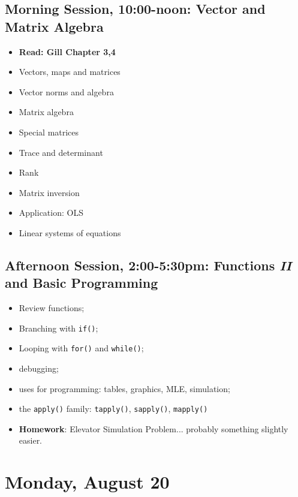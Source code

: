 \documentclass[12pt,a4paper]{article}
\begin{document}
\subsection*{Morning Session, 10:00-noon: Vector and Matrix Algebra}
\begin{itemize}
\setlength{\itemsep}{0pt}
\footnotesize
\item \textbf{Read: Gill Chapter 3,4}
\item Vectors, maps and matrices
\item Vector norms and algebra
\item Matrix algebra
\item Special matrices
\item Trace and determinant
\item Rank
\item Matrix inversion
\item Application: OLS
\item Linear systems of equations


\end{itemize}




\subsection*{Afternoon Session, 2:00-5:30pm: Functions \emph{II} and Basic Programming}
\begin{itemize}
\setlength{\itemsep}{0pt}
\footnotesize
\item Review functions;
\item Branching with \texttt{if()};
\item Looping with \texttt{for()} and \texttt{while()};
\item debugging;
\item uses for programming: tables, graphics, MLE, simulation;
\item the \texttt{apply()} family: \texttt{tapply()}, \texttt{sapply()}, \texttt{mapply()}
\item \textbf{Homework}: Elevator Simulation Problem... probably something slightly easier.
\end{itemize}



\section*{Monday, August 20}
\end{document}
